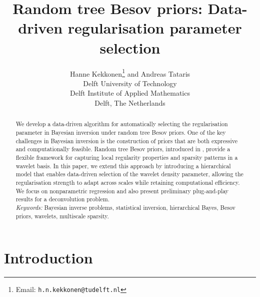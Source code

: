 \documentclass[11pt,a4paper]{article}
\begin{document}
%
\title{Random tree Besov priors: Data-driven regularisation parameter selection}


\author{%
Hanne Kekkonen\thanks{Email: \texttt{h.n.kekkonen@tudelft.nl}}\hspace{1mm} and Andreas Tataris\\[0.6em]
\small{Delft University of Technology}\\
\small{Delft Institute of Applied Mathematics}\\
\small{Delft, The Netherlands}
}


%
\maketitle              %
%
%
\begin{abstract}

We develop a data-driven algorithm for automatically selecting the regularisation parameter in Bayesian inversion under random tree Besov priors.
One of the key challenges in Bayesian inversion is the construction of priors that are both expressive and computationally feasible. Random tree Besov priors, introduced in \cite{Kekkonen2023}, provide a flexible framework for capturing local regularity properties and sparsity patterns in a wavelet basis. In this paper, we extend this approach by introducing a hierarchical model that enables data-driven selection of the wavelet density parameter, allowing the regularisation strength to adapt across scales while retaining computational efficiency. We focus on nonparametric regression and also present preliminary plug-and-play results for a deconvolution problem.\\

\noindent \textit{Keywords:} Bayesian inverse problems, statistical inversion, hierarchical Bayes, Besov priors, wavelets, multiscale sparsity.

\end{abstract}
\section{Introduction}
\end{document}
